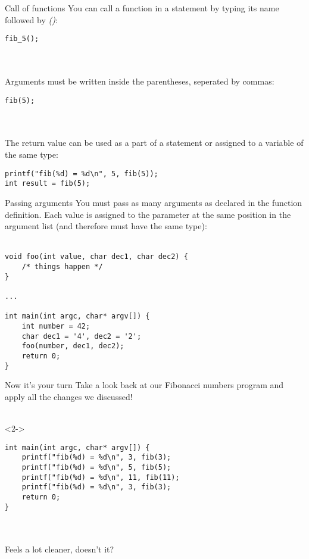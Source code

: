 \begin{frame}[fragile]{Call of functions}
	You can call a function in a statement by typing its name followed by \textit{()}:
	\begin{lstlisting}[numbers=none]
fib_5();
\end{lstlisting} \ \\ \ \\
	Arguments must be written inside the parentheses, seperated by commas:
	\begin{lstlisting}[numbers=none]
fib(5);
\end{lstlisting} \ \\ \ \\
	The return value can be used as a part of a statement or assigned to a variable of the same type:
	\begin{lstlisting}[numbers=none]
printf("fib(%d) = %d\n", 5, fib(5));
int result = fib(5);
\end{lstlisting}
\end{frame}
\begin{frame}[fragile]{Passing arguments}
	You must pass as many arguments as declared in the function definition. Each value is assigned to the parameter at the same position in the argument list (and therefore must have the same type): \ \\ \ \\
	\begin{lstlisting}
void foo(int value, char dec1, char dec2) {
	/* things happen */
}

...

int main(int argc, char* argv[]) {
	int number = 42;
	char dec1 = '4', dec2 = '2';
	foo(number, dec1, dec2);
	return 0;
}
\end{lstlisting}
\end{frame}
\begin{frame}[fragile]{Now it's your turn}
	Take a look back at our Fibonacci numbers program and apply all the changes we discussed! \ \\ \ \\
	\begin{uncoverenv}<2->
		\begin{lstlisting}
int main(int argc, char* argv[]) {
	printf("fib(%d) = %d\n", 3, fib(3);
	printf("fib(%d) = %d\n", 5, fib(5);
	printf("fib(%d) = %d\n", 11, fib(11);
	printf("fib(%d) = %d\n", 3, fib(3);
	return 0;
}
\end{lstlisting} \ \\ \ \\
		Feels a lot cleaner, doesn't it?
	\end{uncoverenv}
\end{frame}

